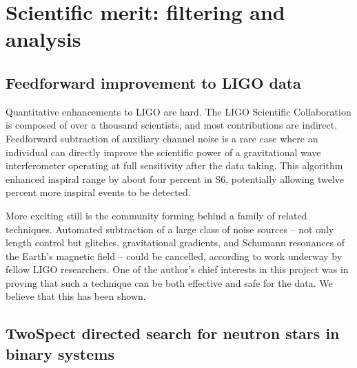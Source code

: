     \section{Scientific merit: filtering and analysis}
    \label{merit}


        \subsection{Feedforward improvement to LIGO data}
        \label{feedforward_end}

Quantitative enhancements to LIGO are hard.
The LIGO Scientific Collaboration is composed of over a thousand scientists, and most contributions are indirect.
Feedforward subtraction of auxiliary channel noise is a rare case where an individual can directly improve the scientific power of a gravitational wave interferometer operating at full sensitivity after the data taking.
This algorithm enhanced inspiral range by about four percent in S6, potentially allowing twelve percent more inspiral events to be detected.

More exciting still is the community forming behind a family of related techniques.
Automated subtraction of a large class of noise sources -- not only length control but glitches, gravitational gradients, and Schumann resonances of the Earth's magnetic field -- could be cancelled, according to work underway by fellow LIGO researchers.
One of the author's chief interests in this project was in proving that such a technique can be both effective and safe for the data.
We believe that this has been shown.

        \subsection{TwoSpect directed search for neutron stars in binary systems}
        \label{TwoSpect_end}




